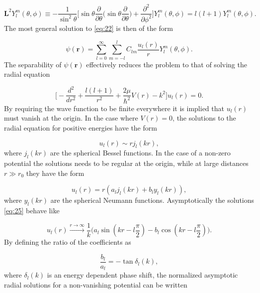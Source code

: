 \documentclass{article}
\numberwithin{equation}{section}
\begin{document}
\begin{equation}
\mathbf{L}^2 Y_l^m(\theta,\phi) \equiv -\frac{1}{ \sin^2\theta} \bigg[ \sin\theta \frac{\partial}{\partial\theta} \bigg(\sin\theta \frac{\partial}{\partial\theta}\bigg) +  \frac{\partial^2}{\partial\phi^2}\bigg] Y_l^m(\theta,\phi) = l(l+1)Y_l^m(\theta,\phi).
\end{equation}
The most general solution to \eqref{eq:22} is then of the form

\begin{equation}\label{eq:32}
\psi(\mathbf{r}) = \sum_{l=0}^{\infty} \sum_{m = -l}^{l} C_{lm}\frac{u_{l}(r)}{r}Y_l^m(\theta,\phi).
\end{equation}
The separability of $\psi(\mathbf{r})$ effectively reduces the problem to that of solving the radial equation

\begin{equation} \label{eq:24}
\bigg[-\frac{d^2}{dr^2} + \frac{l(l+1)}{r^2} + \frac{2\mu}{\hbar^2}V(r) - k^2\bigg]u_l(r) = 0.
\end{equation}
By requiring the wave function to be finite  everywhere it is implied that $u_l(r)$ must vanish at the origin. In the case where $V(r) = 0$, the solutions to the radial equation for positive energies have the form

\begin{equation}
u_l(r) \sim r j_l(kr),
\end{equation}
where $j_l(kr)$ are the spherical Bessel functions. In the case of a non-zero potential the solutions needs to be regular at the origin, while at large distances $r \gg r_0$ they have the form

\begin{equation}\label{eq:25}
u_l(r) = r(a_l j_l(kr)+b_l y_l(kr)),
\end{equation} 
where $y_l(kr)$ are the spherical Neumann functions. Asymptotically the solutions \eqref{eq:25} behave like

\begin{equation}
u_l(r) \xrightarrow{r\to\infty} \frac{1}{k}\big(a_l \sin(kr - l\frac{\pi}{2})-b_l \cos(kr - l\frac{\pi}{2})\big).
\end{equation} 
By defining the ratio of the coefficients as

\begin{equation}
\frac{b_l}{a_l} = -\tan\delta_l(k),
\end{equation} 
where $\delta_l(k)$ is an energy dependent phase shift, the normalized asymptotic radial solutions for a non-vanishing potential can be written
\end{document}
